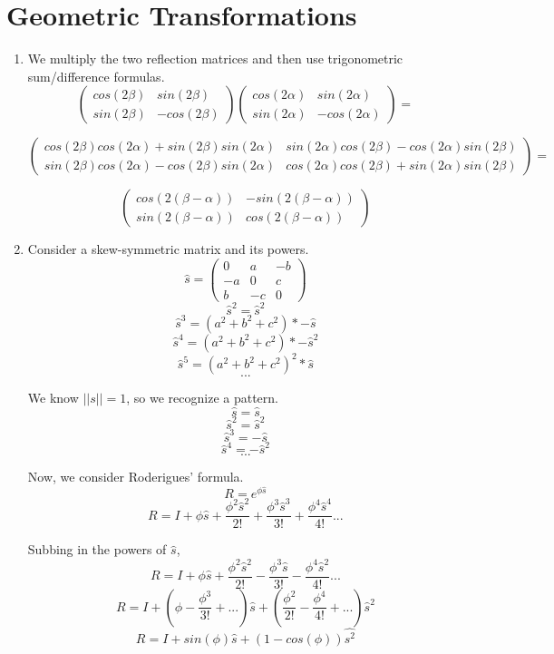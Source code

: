\documentclass[11pt]{article}
\begin{document}
\section{Geometric Transformations}
\begin{enumerate}
\item
    We multiply the two reflection matrices and then use trigonometric
    sum/difference formulas.
    $$\begin{pmatrix}cos(2\beta)&sin(2\beta)\\sin(2\beta)&-cos(2\beta)\end{pmatrix}
    \begin{pmatrix}cos(2\alpha)&sin(2\alpha)\\sin(2\alpha)&-cos(2\alpha)\end{pmatrix} = $$

    $$\begin{pmatrix}cos(2\beta) cos(2\alpha) + sin(2\beta) sin(2\alpha) &
    sin(2\alpha) cos(2\beta) - cos(2\alpha) sin(2\beta) \\
    sin(2\beta) cos(2\alpha) - cos(2\beta) sin(2\alpha)&
    cos(2\alpha) cos(2\beta) + sin(2\alpha) sin(2\beta)\end{pmatrix} = $$

    $$\begin{pmatrix}cos(2(\beta-\alpha))&-sin(2(\beta-\alpha))\\
    sin(2(\beta-\alpha))&cos(2(\beta-\alpha))\end{pmatrix}$$
    
\item
    Consider a skew-symmetric matrix and its powers.
    $$\hat{s} = \begin{pmatrix}0&a&-b\\-a&0&c\\b&-c&0\end{pmatrix}$$
    $$\hat{s}^2 = \hat{s}^2$$
    $$\hat{s}^3 = (a^2 + b^2 + c^2)*-\hat{s}$$
    $$\hat{s}^4 = (a^2 + b^2 + c^2)*-\hat{s}^2$$
    $$\hat{s}^5 = (a^2 + b^2 + c^2)^2*\hat{s}$$
    $$...$$

    We know $||s|| = 1$, so we recognize a pattern.
    $$\hat{s} = \hat{s}$$
    $$\hat{s}^2 = \hat{s}^2$$
    $$\hat{s}^3 = -\hat{s}$$
    $$\hat{s}^4 = -\hat{s}^2$$
    $$...$$

    Now, we consider Roderigues' formula.
    $$R = e^{\phi\hat{s}}$$
    $$R = I + \phi\hat{s} + \frac{\phi^2\hat{s}^2}{2!} +
    \frac{\phi^3\hat{s}^3}{3!} + \frac{\phi^4\hat{s}^4}{4!}...$$

    Subbing in the powers of $\hat{s}$,
    $$R = I + \phi\hat{s} + \frac{\phi^2\hat{s}^2}{2!} -
    \frac{\phi^3\hat{s}}{3!} - \frac{\phi^4\hat{s}^2}{4!}...$$
    $$R = I + (\phi - \frac{\phi^3}{3!} + ...)\hat{s}
    + (\frac{\phi^2}{2!}  - \frac{\phi^4}{4!} + ...)\hat{s}^2$$
    $$R = I + sin(\phi)\hat{s} + (1 - cos(\phi))\hat{s^2}$$


\end{enumerate}
\end{document}
